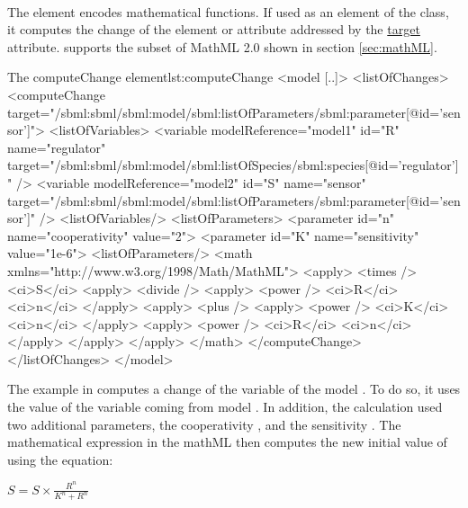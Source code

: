 \paragraph{}
\label{sec:math}

The  element encodes mathematical functions. If used as an element of the  class, it computes the change of the element or attribute addressed by the \hyperref[sec:target]{target} attribute. \currentLV supports the subset of MathML 2.0 shown in section \ref{sec:mathML}.


\begin{myXmlLst}{The computeChange element}{lst:computeChange}
<model [..]>
	<listOfChanges>
	<computeChange target="/sbml:sbml/sbml:model/sbml:listOfParameters/sbml:parameter[@id='sensor']">
		<listOfVariables>
			<variable modelReference="model1" id="R" name="regulator" 
				target="/sbml:sbml/sbml:model/sbml:listOfSpecies/sbml:species[@id='regulator']" />
			<variable modelReference="model2" id="S" name="sensor"
				target="/sbml:sbml/sbml:model/sbml:listOfParameters/sbml:parameter[@id='sensor']" />
		<listOfVariables/>
		<listOfParameters>
			<parameter id="n" name="cooperativity" value="2">
			<parameter id="K" name="sensitivity" value="1e-6">
		<listOfParameters/>
		<math  xmlns="http://www.w3.org/1998/Math/MathML">
        <apply>
          <times />
          <ci>S</ci>
          <apply>
            <divide />
            <apply>
              <power />
              <ci>R</ci>
              <ci>n</ci>
            </apply>
            <apply>
              <plus />
              <apply>
                <power />
                <ci>K</ci>
                <ci>n</ci>
              </apply>
              <apply>
                <power />
                <ci>R</ci>
                <ci>n</ci>
              </apply>
            </apply> 
		</apply>
		</math>
	</computeChange>
	</listOfChanges>
</model>
\end{myXmlLst}

The example in  computes a change of the variable  of the model . To do so, it uses the value of the variable  coming from model . In addition, the calculation used two additional parameters, the cooperativity , and the sensitivity .
The mathematical expression in the mathML then computes the new initial value of  using the equation:

\begin{math}
S =  S \times \frac{R^{n}}{K^{n}+R^{n}}
\end{math}
